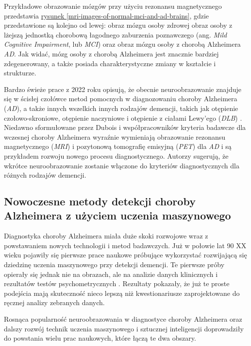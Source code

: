 Przykładowe obrazowanie mózgów przy użyciu rezonansu magnetycznego przedstawia \hyperref[mri-images-of-normal-mci-and-ad-brains]{rysunek \ref*{mri-images-of-normal-mci-and-ad-brains}}, gdzie przedstawione są kolejno od lewej: obraz mózgu osoby zdrowej obraz osoby z lżejszą jednostką chorobową łagodnego zaburzenia poznawczego (ang. \emph{Mild Cognitive Impairment}, lub \emph{MCI}) oraz obraz mózgu osoby z chorobą Alzheimera \emph{AD}.
Jak widać, mózg osoby z chorobą Alzheimera jest znacznie bardziej zdegenerowany, a także posiada charakterystyczne zmiany w kształcie i strukturze.

Bardzo świeże prace z 2022 roku opisują, że obecnie neuroobrazowanie znajduje się w ścisłej czołówce metod pomocnych w diagnozowaniu choroby Alzheimera (\emph{AD}), a także innych wszelkich innych rodzajów demencji, takich jak otępienie czołowo-skroniowe, otępienie naczyniowe i otępienie z ciałami Lewy'ego (\emph{DLB}) \cite{scheltens2022imaging}.
Niedawno sformułowane przez Dubois i współpracowników kryteria badawcze dla wczesnej choroby Alzheimera wyraźnie wymieniają obrazowanie rezonansu magnetycznego (\emph{MRI}) i pozytonową tomografię emisyjną (\emph{PET}) dla \emph{AD} i są przykładem rozwoju nowego procesu diagnostycznego.
Autorzy sugerują, że wkrótce neuroobrazowanie zostanie włączone do kryteriów diagnostycznych dla różnych rodzajów demencji.

\subsection{Nowoczesne metody detekcji choroby Alzheimera z użyciem uczenia maszynowego}
\label{modern-detection-methods-for-alzheimers-using-machine-learning}

Diagnostyka choroby Alzheimera miała duże skoki rozwojowe wraz z powstawaniem nowych technologii i metod badawczych.
Już w połowie lat 90 XX wieku pojawiły się pierwsze prace naukowe próbujące wykorzystać rozwijającą się dziedzinę uczenia maszynowego przy detekcji demencji.
Te pierwsze próby opierały się jednak nie na obrazach, ale na analizie danych klinicznych i rezultatów testów psychometrycznych \cite{datta1996applying}.
Rezultaty pokazały, że już te proste podejścia mają skuteczność nieco lepszą niż kwestionariusze zaprojektowane do ręcznej analizy zebranych danych.

Rosnąca popularność neuroobrazowania w diagnostyce choroby Alzheimera oraz dalszy rozwój technik uczenia maszynowego i sztucznej inteligencji doprowadziły do powstania wielu prac naukowych, które łączą te dwa obszary.

